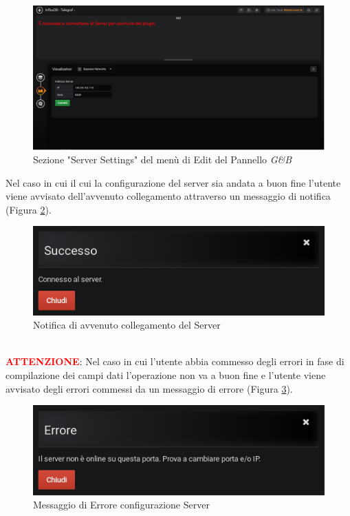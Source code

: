 \begin{figure}[H]
	\begin{center}
		\includegraphics[scale=0.37]{./images/ServerSettings.png}
		 \caption{Sezione "Server Settings" del menù di Edit del Pannello \textit{G\&B}}	
		 \label{ServerSettings}
	\end{center}
\end{figure}

Nel caso in cui il cui la configurazione del server sia andata a buon fine l'utente viene avvisato dell'avvenuto collegamento attraverso un messaggio di notifica (Figura \ref{NotificaServer}).

\begin{figure}[H]
	\begin{center}
		\includegraphics[scale=0.6]{./images/NotificaServer.png}
		 \caption{Notifica di avvenuto collegamento del Server}	
		 \label{NotificaServer}
	\end{center}
\end{figure}

~\\
\textbf{\textcolor{red}{ATTENZIONE}}: Nel caso in cui l'utente abbia commesso degli errori in fase di compilazione dei campi dati l'operazione non va a buon fine e l'utente viene avvisato degli errori commessi da un messaggio di errore (Figura \ref{ErroreServer}).

\begin{figure}[H]
	\begin{center}
		\includegraphics[scale=0.6]{./images/ErroreServer.png}
		 \caption{Messaggio di Errore configurazione Server}	
		 \label{ErroreServer}
	\end{center}
\end{figure}


